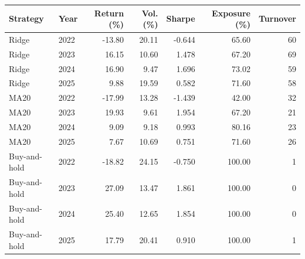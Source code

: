 \begin{tabular}{llrrrrr}
\toprule
Strategy & Year & Return (\%) & Vol. (\%) & Sharpe & Exposure (\%) & Turnover \\
\midrule
Ridge & 2022 & -13.80 & 20.11 & -0.644 & 65.60 & 60 \\
Ridge & 2023 & 16.15 & 10.60 & 1.478 & 67.20 & 69 \\
Ridge & 2024 & 16.90 & 9.47 & 1.696 & 73.02 & 59 \\
Ridge & 2025 & 9.88 & 19.59 & 0.582 & 71.60 & 58 \\
MA20 & 2022 & -17.99 & 13.28 & -1.439 & 42.00 & 32 \\
MA20 & 2023 & 19.93 & 9.61 & 1.954 & 67.20 & 21 \\
MA20 & 2024 & 9.09 & 9.18 & 0.993 & 80.16 & 23 \\
MA20 & 2025 & 7.67 & 10.69 & 0.751 & 71.60 & 26 \\
Buy-and-hold & 2022 & -18.82 & 24.15 & -0.750 & 100.00 & 1 \\
Buy-and-hold & 2023 & 27.09 & 13.47 & 1.861 & 100.00 & 0 \\
Buy-and-hold & 2024 & 25.40 & 12.65 & 1.854 & 100.00 & 0 \\
Buy-and-hold & 2025 & 17.79 & 20.41 & 0.910 & 100.00 & 1 \\
\bottomrule
\end{tabular}

